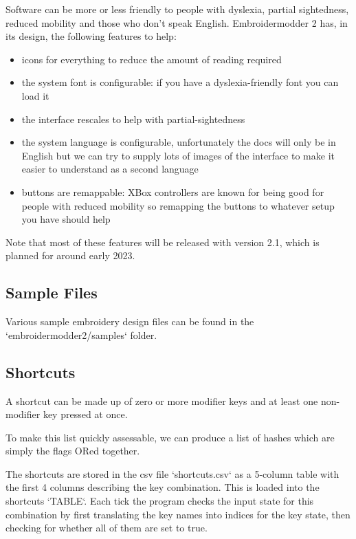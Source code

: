 \documentclass[a4paper]{report}
\begin{document}
Software can be more or less friendly to people with dyslexia, partial
sightedness, reduced mobility and those who don't speak English. Embroidermodder
2 has, in its design, the following features to help:

\begin{itemize}
\item icons for everything to reduce the amount of reading required
\item the system font is configurable: if you have a dyslexia-friendly font you
    can load it
\item the interface rescales to help with partial-sightedness
\item the system language is configurable, unfortunately the docs will only be
    in English but we can try to supply lots of images of the interface to make it
    easier to understand as a second language
\item buttons are remappable: XBox controllers are known for being good for
    people with reduced mobility so remapping the buttons to whatever setup you have
    should help
\end{itemize}

Note that most of these features will be released with version 2.1, which is planned for around
early 2023.

\subsection{Sample Files}

Various sample embroidery design files can be found in the `embroidermodder2/samples` folder.

\subsection{Shortcuts}

A shortcut can be made up of zero or more modifier keys and at least one non-modifier key
pressed at once.

To make this list quickly assessable, we can produce a list of hashes which are simply the
flags ORed together.

The shortcuts are stored in the csv file `shortcuts.csv` as a 5-column table
with the first 4 columns describing the key combination. This is loaded into
the shortcuts `TABLE`. Each tick the program checks the input state for this
combination by first translating the key names into indices for the key state,
then checking for whether all of them are set to true.
\end{document}
